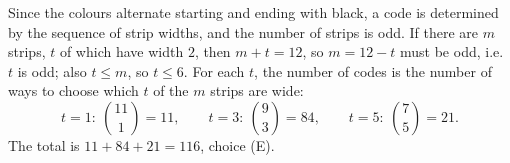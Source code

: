 Since the colours alternate starting and ending with black, a code is determined by the sequence of strip widths, and the number of strips is odd. If there are $m$ strips, $t$ of which have width $2$, then $m+t=12$, so $m=12-t$ must be odd, i.e. $t$ is odd; also $t\le m$, so $t\le6$. For each $t$, the number of codes is the number of ways to choose which $t$ of the $m$ strips are wide:
\[
t=1:\ \binom{11}{1}=11,\qquad t=3:\ \binom{9}{3}=84,\qquad t=5:\ \binom{7}{5}=21 .
\]
The total is $11+84+21=\boxed{116}$, choice (E).
